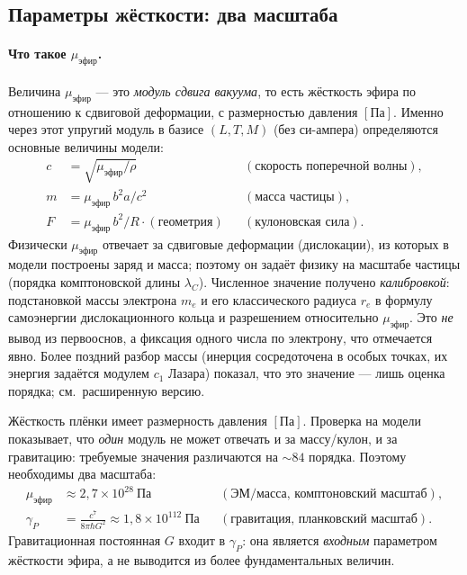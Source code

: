\documentclass[12pt,a4paper]{article}
\begin{document}
\subsection{Параметры жёсткости: два масштаба}
\paragraph{Что такое $\mu_{\text{эфир}}$.}
Величина $\mu_{\text{эфир}}$ --- это \emph{модуль сдвига вакуума}, то есть
жёсткость эфира по отношению к сдвиговой деформации, с размерностью давления
$[\text{Па}]$. Именно через этот упругий модуль в базисе $(L,T,M)$ (без
си-ампера) определяются основные величины модели:
\begin{align}
c &= \sqrt{\mu_{\text{эфир}}/\rho} && (\text{скорость поперечной волны}),\\
m &= \mu_{\text{эфир}}\,b^2 a / c^2 && (\text{масса частицы}),\\
F &= \mu_{\text{эфир}}\,b^2 / R \cdot (\text{геометрия}) && (\text{кулоновская сила}).
\end{align}
Физически $\mu_{\text{эфир}}$ отвечает за сдвиговые деформации (дислокации), из
которых в модели построены заряд и масса; поэтому он задаёт физику на масштабе
частицы (порядка комптоновской длины $\lambda_C$). Численное значение
получено \emph{калибровкой}: подстановкой массы электрона $m_e$ и его
классического радиуса $r_e$ в формулу самоэнергии дислокационного кольца и
разрешением относительно $\mu_{\text{эфир}}$. Это \emph{не} вывод из первооснов,
а фиксация одного числа по электрону, что отмечается явно. Более поздний разбор массы
(инерция сосредоточена в особых точках, их энергия задаётся модулем $c_1$ Лазара)
показал, что это значение --- лишь оценка порядка; см.\ расширенную версию.

Жёсткость плёнки имеет размерность давления $[\text{Па}]$. Проверка на модели
показывает, что \emph{один} модуль не может отвечать и за массу/кулон, и за
гравитацию: требуемые значения различаются на $\sim\!84$ порядка. Поэтому
необходимы два масштаба:
\begin{align}
\mu_{\text{эфир}} &\approx 2{,}7\times10^{28}~\text{Па} && (\text{ЭМ/масса, комптоновский масштаб}),\\
\gamma_P &= \frac{c^7}{8\pi\hbar G^2}\approx 1{,}8\times10^{112}~\text{Па} && (\text{гравитация, планковский масштаб}).
\end{align}
Гравитационная постоянная $G$ входит в $\gamma_P$: она является \emph{входным}
параметром жёсткости эфира, а не выводится из более фундаментальных величин.
\end{document}
